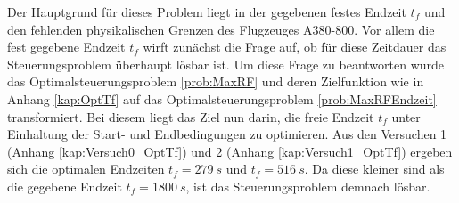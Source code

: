 Der Hauptgrund für dieses Problem liegt in der gegebenen festes Endzeit $t_f$ und den fehlenden physikalischen Grenzen des Flugzeuges A380-800. Vor allem die fest gegebene Endzeit $t_f$ wirft zunächst die Frage auf, ob für diese Zeitdauer das Steuerungsproblem überhaupt lösbar ist. Um diese Frage zu beantworten wurde das Optimalsteuerungsproblem \ref{prob:MaxRF} und deren Zielfunktion wie in Anhang \ref{kap:OptTf}  auf das Optimalsteuerungsproblem \ref{prob:MaxRFEndzeit} transformiert. Bei diesem liegt das Ziel nun darin, die freie Endzeit $t_f$ unter Einhaltung der Start- und Endbedingungen zu optimieren. Aus den Versuchen 1 (Anhang \ref{kap:Versuch0_OptTf}) und 2 (Anhang \ref{kap:Versuch1_OptTf}) ergeben sich die optimalen Endzeiten $t_f = 279 \ s$ und $t_f = 516 \ s$. Da diese kleiner sind als die gegebene Endzeit $t_f = 1800 \ s$, ist das Steuerungsproblem demnach lösbar.

